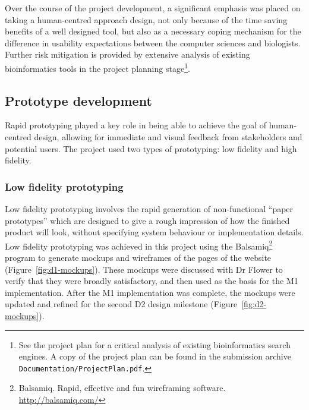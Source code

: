 Over the course of the project development, a significant emphasis was
placed on taking a human-centred approach design, not only because of
the time saving benefits of a well designed tool, but also as a
necessary coping mechanism for the difference in usability
expectations between the computer sciences and biologists. Further
risk mitigation is provided by extensive analysis of existing
bioinformatics tools in the project planning stage\footnote{See the
  project plan for a critical analysis of existing bioinformatics
  search engines. A copy of the project plan can be found in the
  submission archive \texttt{Documentation/ProjectPlan.pdf}.}.

\subsection{Prototype development}

Rapid prototyping played a key role in being able to achieve the goal
of human-centred design, allowing for immediate and visual feedback
from stakeholders and potential users. The project used two types of
prototyping: low fidelity and high fidelity.

\subsubsection*{Low fidelity prototyping}

Low fidelity prototyping involves the rapid generation of
non-functional ``paper prototypes'' which are designed to give a rough
impression of how the finished product will look, without specifying
system behaviour or implementation details. Low fidelity prototyping
was achieved in this project using the
Balsamiq\footnote{Balsamiq. Rapid, effective and fun wireframing
  software. \url{http://balsamiq.com/}} program to generate mockups
and wireframes of the pages of the website
(Figure~\ref{fig:d1-mockups}). These mockups were discussed with Dr
Flower to verify that they were broadly satisfactory, and then used as
the basis for the M1 implementation. After the M1 implementation was
complete, the mockups were updated and refined for the second D2
design milestone (Figure~\ref{fig:d2-mockups}).


